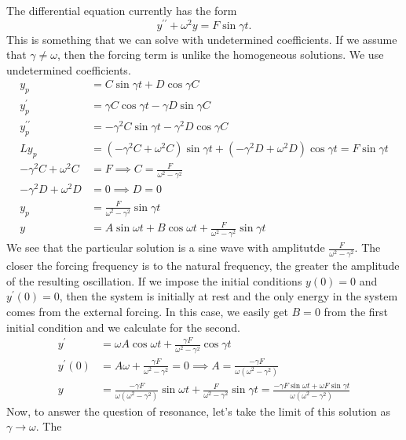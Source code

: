 \documentclass[fleqn,letterpaper]{report}
\begin{document}
The differential equation currently has the form
\begin{equation*}
y^{\prime \prime} + \omega^2 y = F \sin \gamma t.
\end{equation*}
This is something that we can solve with undetermined
coefficients. If we assume that $\gamma \neq \omega$, then the
forcing term is unlike the homogeneous solutions. We use
undetermined coefficients. 
\begin{align*}
y_p & = C \sin \gamma t + D \cos \gamma C \\
y_p^\prime & = \gamma C \cos \gamma t - \gamma D \sin \gamma C \\
y_p^{\prime \prime} & = -\gamma^2 C \sin \gamma t - \gamma^2 D
\cos \gamma C \\
Ly_p & = (-\gamma^2 C + \omega^2 C) \sin \gamma t + (-\gamma^2 D
+ \omega^2 D) \cos \gamma t = F \sin \gamma t \\
-\gamma^2 C + \omega^2 C & = F \implies C = \frac{F}{\omega^2 -
\gamma^2 } \\
-\gamma^2 D + \omega^2 D & = 0 \implies D = 0 \\
y_p & = \frac{F}{\omega^2 - \gamma^2} \sin \gamma t \\
y & = A \sin \omega t + B \cos \omega t + \frac{F}{\omega^2 -
\gamma^2} \sin \gamma t 
\end{align*}
We see that the particular solution is a sine wave with
amplitutde $\frac{F}{\omega^2 - \gamma^2}$. The closer the
forcing frequency is to the natural frequency, the greater the
amplitude of the resulting oscillation.  If we impose the
initial conditions $y(0) = 0$ and $y^\prime(0) = 0$, then the
system is initially at rest and the only energy in the system
comes from the external forcing.  In this case, we easily get
$B=0$ from the first initial condition and we calculate for
the second.
\begin{align*}
y^{\prime} & = \omega A \cos \omega t + \frac{\gamma F}{\omega^2 -
\gamma^2} \cos \gamma t \\
y^\prime (0) & = A \omega + \frac{\gamma F}{\omega^2 - \gamma^2}
= 0 \implies A = \frac{-\gamma F}{\omega(\omega^2 - \gamma^2)}
\\
y & = \frac{-\gamma F}{\omega( \omega^2 - \gamma^2)} \sin \omega t
+ \frac{F}{\omega^2 - \gamma^2} \sin \gamma t = \frac{-\gamma F
\sin \omega t + \omega F \sin \gamma t}{\omega (\omega^2 -
\gamma^2)} 
\end{align*}
Now, to answer the question of resonance, let's take the limit
of this solution as $\gamma \rightarrow \omega$. The
\end{document}
